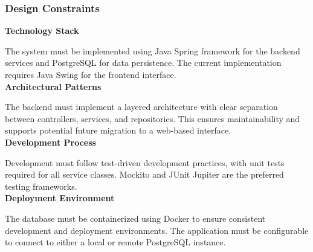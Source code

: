 \documentclass[a4paper,10pt]{article}
\begin{document}
        \subsubsection{Design Constraints}
        \textbf{Technology Stack}

        The system must be implemented using Java Spring framework for the backend services and PostgreSQL for data persistence. The current implementation requires Java Swing for the frontend interface. \\

        \textbf{Architectural Patterns}

        The backend must implement a layered architecture with clear separation between controllers, services, and repositories. This ensures maintainability and supports potential future migration to a web-based interface. \\

        \textbf{Development Process}

        Development must follow test-driven development practices, with unit tests required for all service classes. Mockito and JUnit Jupiter are the preferred testing frameworks. \\

        \textbf{Deployment Environment}

        The database must be containerized using Docker to ensure consistent development and deployment environments. The application must be configurable to connect to either a local or remote PostgreSQL instance. \\
\end{document}
